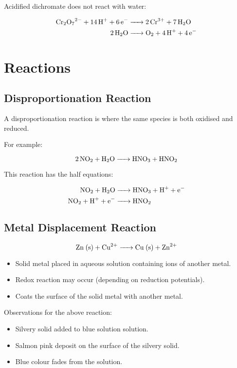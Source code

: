 \documentclass[a4paper,11pt]{article}
\begin{document}
Acidified dichromate does not react with water:

$$
\begin{aligned}
\ce{Cr2O7^{2-} + 14H+ + 6e- & -> 2Cr^{3+} + 7H2O} \\
\ce{2H2O & -> O2 + 4H+ + 4e-} \\
\end{aligned}
$$



\section{Reactions}

\subsection{Disproportionation Reaction}

A disproportionation reaction is where the same species is both oxidised and
reduced.

For example:

$$
\ce{2NO2 + H2O -> HNO3 + HNO2}
$$

This reaction has the half equations:

$$
\begin{aligned}
\ce{NO2 + H2O & -> HNO3 + H+ + e-} \\
\ce{NO2 + H+ + e- & -> HNO2} \\
\end{aligned}
$$

\subsection{Metal Displacement Reaction}

$$
\ce{Zn (s) + Cu^{2+} -> Cu (s) + Zn^{2+}}
$$

\begin{itemize}
\item Solid metal placed in aqueous solution containing ions of another metal.
\item Redox reaction may occur (depending on reduction potentials).
\item Coats the surface of the solid metal with another metal.
\end{itemize}

Observations for the above reaction:

\begin{itemize}
\item Silvery solid added to blue solution solution.
\item Salmon pink deposit on the surface of the silvery solid.
\item Blue colour fades from the solution.
\end{itemize}
\end{document}
